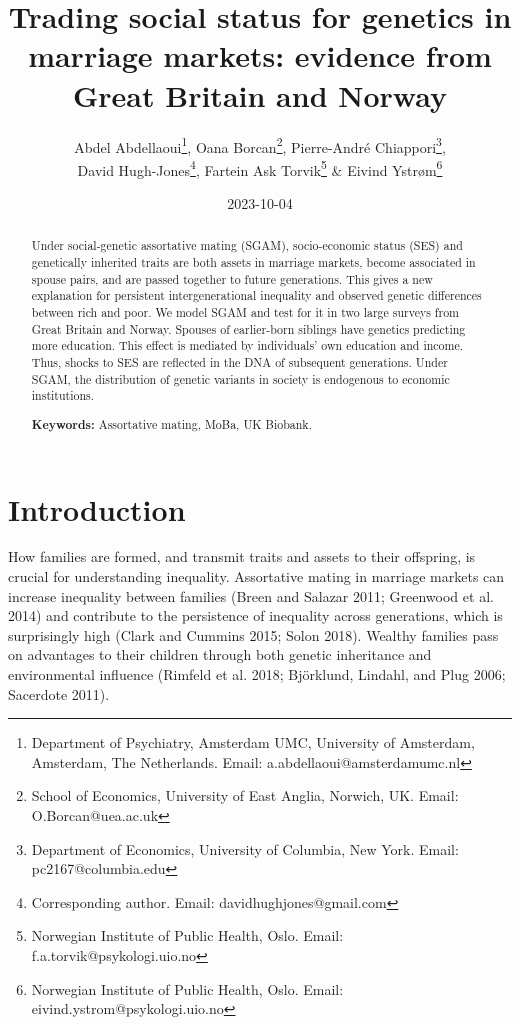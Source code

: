 \documentclass[
  12pt,
]{article}
\title{Trading social status for genetics in marriage markets:
evidence from Great Britain and Norway}
\author{Abdel Abdellaoui\thanks{Department of Psychiatry, Amsterdam UMC, University 
of Amsterdam, Amsterdam, The Netherlands. Email: a.abdellaoui@amsterdamumc.nl},
Oana Borcan\thanks{School of Economics, University of East Anglia, Norwich, 
UK. Email: O.Borcan@uea.ac.uk},
Pierre-André Chiappori\thanks{Department of Economics, University of Columbia, 
  New York. Email: pc2167@columbia.edu},\\
David Hugh-Jones\thanks{Corresponding author. Email: davidhughjones@gmail.com},
Fartein Ask Torvik\thanks{Norwegian Institute of Public Health, Oslo. 
  Email: f.a.torvik@psykologi.uio.no} \&
Eivind Ystrøm\thanks{Norwegian Institute of Public Health, Oslo. 
  Email: eivind.ystrom@psykologi.uio.no}}
\date{2023-10-04}
\theoremstyle{definition}
\theoremstyle{definition}
\theoremstyle{definition}
\theoremstyle{definition}
\theoremstyle{remark}
\begin{document}
\maketitle
\begin{abstract}
Under social-genetic assortative mating (SGAM), socio-economic status (SES) and
genetically inherited traits are both assets in marriage markets, become
associated in spouse pairs, and are passed together to future generations.
This gives a new explanation for persistent intergenerational inequality and
observed genetic differences between rich and poor. We model SGAM and test
for it in two large surveys from Great Britain and Norway. Spouses of
earlier-born siblings have genetics predicting more education. This effect is
mediated by individuals' own education and income. Thus, shocks to SES are
reflected in the DNA of subsequent generations. Under SGAM, the distribution of
genetic variants in society is endogenous to economic institutions.

\par

\textbf{Keywords:} Assortative mating, MoBa, UK Biobank.
\end{abstract}

\normalem

\hypertarget{introduction}{%
\section{Introduction}\label{introduction}}

How families are formed, and transmit traits and assets to their offspring, is
crucial for understanding inequality. Assortative mating in marriage markets can
increase inequality between families (Breen and Salazar 2011; Greenwood et al. 2014)
and contribute to the persistence of inequality across generations, which
is surprisingly high (Clark and Cummins 2015; Solon 2018). Wealthy
families pass on advantages to their children through both genetic inheritance
and environmental influence (Rimfeld et al. 2018; Björklund, Lindahl, and Plug 2006; Sacerdote 2011).
\end{document}
